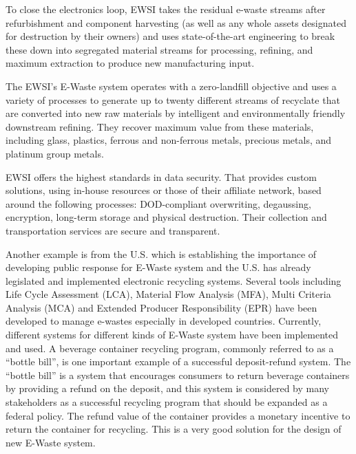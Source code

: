 To close the electronics loop, EWSI takes the residual e-waste streams after refurbishment and component harvesting (as well as any whole assets designated for destruction by their owners) and uses state-of-the-art engineering to break these down into segregated material streams for processing, refining, and maximum extraction to produce new manufacturing input.

The EWSI's E-Waste system operates with a zero-landfill objective and uses a variety of processes to generate up to twenty different streams of recyclate that are converted into new raw materials by intelligent and environmentally friendly downstream refining. They recover maximum value from these materials, including glass, plastics, ferrous and non-ferrous metals, precious metals, and platinum group metals.

EWSI offers the highest standards in data security. That provides custom solutions, using in-house resources or those of their affiliate network, based around the following processes: DOD-compliant overwriting, degaussing, encryption, long-term storage and physical destruction. Their collection and transportation services are secure and transparent.

Another example is from the U.S. which is establishing the importance of developing public response for E-Waste system and the U.S. has already legislated and implemented electronic recycling systems. Several tools including Life Cycle Assessment (LCA), Material Flow Analysis (MFA), Multi Criteria Analysis (MCA) and Extended Producer Responsibility (EPR) have been developed to manage e-wastes especially in developed countries\cite{kiddee2013electronic}. Currently, different systems for different kinds of E-Waste system have been implemented and used. A beverage container recycling program, commonly referred
to as a ``bottle bill'', is one important example of a successful deposit-refund system. The ``bottle bill'' is a system that encourages consumers to return beverage containers by providing a refund on the deposit, and this system is considered by many stakeholders as a successful recycling program that should be expanded as a federal policy. The refund value of the container provides a monetary incentive to return the container for recycling\cite{kahhat2008exploring}. This is a very good solution for the design of new E-Waste system.

\label{relatedwork}